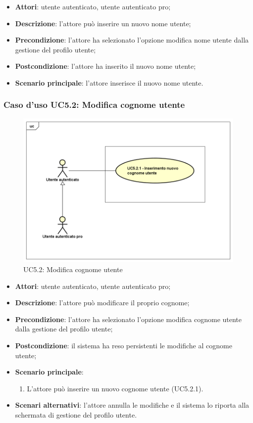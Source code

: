 \begin{itemize}
	\item \textbf{Attori}: utente autenticato, utente autenticato pro;
	\item \textbf{Descrizione}: l'attore può inserire un nuovo nome utente;
	\item \textbf{Precondizione}: l'attore ha selezionato l'opzione modifica nome utente dalla gestione del profilo utente;
	\item \textbf{Postcondizione}: l'attore ha inserito il nuovo nome utente;
	\item \textbf{Scenario principale}: l'attore inserisce il nuovo nome utente.
\end{itemize}

\subsubsection{Caso d'uso UC5.2: Modifica cognome utente}
\label{UC5.2}
\begin{figure}[h]
	\centering
	\includegraphics[scale=0.5,keepaspectratio]{UML/UC5_2.png}
	\caption{UC5.2: Modifica cognome utente}
\end{figure}
\begin{itemize}
	\item \textbf{Attori}: utente autenticato, utente autenticato pro;
	\item \textbf{Descrizione}: l'attore può modificare il proprio cognome;
	\item \textbf{Precondizione}: l'attore ha selezionato l'opzione modifica cognome utente dalla gestione del profilo utente; 
	\item \textbf{Postcondizione}: il sistema ha reso persistenti le modifiche al cognome utente;
	\item \textbf{Scenario principale}:
	\begin{enumerate}
		\item L'attore può inserire un nuovo cognome utente (UC5.2.1).
	\end{enumerate}
	\item \textbf{Scenari alternativi}: l'attore annulla le modifiche e il sistema lo riporta alla schermata di gestione del profilo utente.
\end{itemize}

